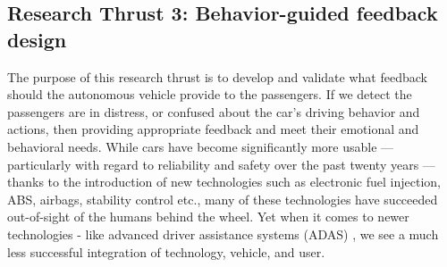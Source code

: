 \subsection{Research Thrust 3: Behavior-guided feedback design}
\label{sec:feedback}

The purpose of this research thrust is to develop and validate what feedback should the autonomous vehicle provide to the passengers.
If we detect the passengers are in distress, or confused about the car's driving behavior and actions, then providing appropriate feedback and meet their emotional and behavioral needs. 
While cars have become significantly more usable — particularly with regard to reliability and safety over the past twenty years — thanks to the introduction of new technologies such as electronic fuel injection, ABS, airbags, stability control etc., many of these technologies have succeeded out-of-sight of the humans behind the wheel.
Yet when it comes to newer technologies - like advanced driver assistance systems (ADAS) , we see a much less successful integration of technology, vehicle, and user.
